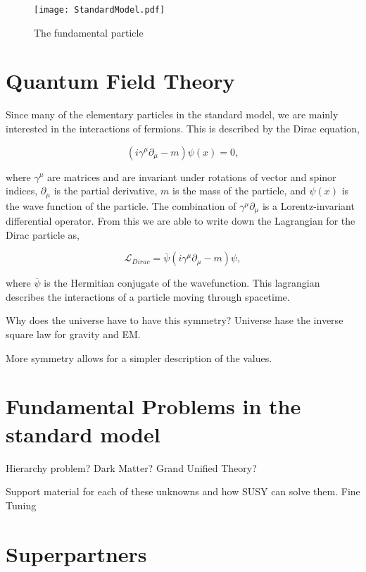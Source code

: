 \begin{figure}
 	\centering
	\texttt{[image: StandardModel.pdf]}
 	\caption{The fundamental particle}
 	\label{SMParticles} 
\end{figure}
 
 \section{Quantum Field Theory}
 \label{QFT}
 
 Since many of the elementary particles in the standard model, we are mainly interested in the interactions of fermions. This is described by the Dirac equation, 
 
\begin{equation}
(i\gamma^\mu\partial_\mu-m)\psi(x)=0\label{Dirac},
\end{equation}

where $\gamma^\mu$ are matrices and are invariant under rotations of vector and spinor indices, $\partial_\mu$ is the partial derivative, $m$ is the mass of the particle, and $\psi(x)$ is the wave function of the particle. The combination of $\gamma^\mu\partial_\mu$ is a Lorentz-invariant differential operator. From this we are able to write down the Lagrangian for the Dirac particle as, 

\begin{equation}
\mathcal{L}_{Dirac}=\overline{\psi}(i\gamma^\mu\partial_\mu-m)\psi,
\end{equation}
 
 where $\overline{\psi}$ is the Hermitian conjugate of the wavefunction. This lagrangian describes the interactions of a particle moving through spacetime. 

Why does the universe have to have this symmetry?
Universe hase the inverse square law for gravity and EM.

More symmetry allows for a simpler description of the values. 

\section{Fundamental Problems in the standard model}
\label{sec:Hierarchy}

Hierarchy problem?
Dark Matter?
Grand Unified Theory?

Support material for each of these unknowns and how SUSY can solve them. Fine Tuning

\section{Superpartners}
\label{sec:superpartners}

